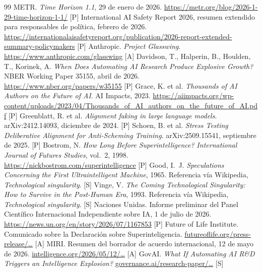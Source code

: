 \documentclass[10pt]{article}
\newcommand{\tP}{\textsf{\small[P]}}
\newcommand{\tS}{\textsf{\small[S]}}
\newcommand{\tA}{\textsf{\small[A]}}
\begin{document}
\begin{thebibliography}{99}\small
{} METR. \emph{Time Horizon 1.1}, 29 de enero de 2026. \url{https://metr.org/blog/2026-1-29-time-horizon-1-1/} \tP
{} International AI Safety Report 2026, resumen extendido para responsables de pol\'itica, febrero de 2026. \url{https://internationalaisafetyreport.org/publication/2026-report-extended-summary-policymakers} \tP
{} Anthropic. \emph{Project Glasswing}. \url{https://www.anthropic.com/glasswing} \tA
{} Davidson, T., Halperin, B., Houlden, T., Korinek, A. \emph{When Does Automating AI Research Produce Explosive Growth?} NBER Working Paper 35155, abril de 2026. \url{https://www.nber.org/papers/w35155} \tP
{} Grace, K. et al. \emph{Thousands of AI Authors on the Future of AI}. AI Impacts, 2023. \url{https://aiimpacts.org/wp-content/uploads/2023/04/Thousands_of_AI_authors_on_the_future_of_AI.pdf} \tP
{} Greenblatt, R. et al. \emph{Alignment faking in large language models}. arXiv:2412.14093, diciembre de 2024. \tP
{} Schoen, B. et al. \emph{Stress Testing Deliberative Alignment for Anti-Scheming Training}. arXiv:2509.15541, septiembre de 2025. \tP
{} Bostrom, N. \emph{How Long Before Superintelligence?} \emph{International Journal of Futures Studies}, vol.~2, 1998. \url{https://nickbostrom.com/superintelligence} \tP
{} Good, I.~J. \emph{Speculations Concerning the First Ultraintelligent Machine}, 1965. Referencia v\'ia Wikipedia, \emph{Technological singularity}. \tS
{} Vinge, V. \emph{The Coming Technological Singularity: How to Survive in the Post-Human Era}, 1993. Referencia v\'ia Wikipedia, \emph{Technological singularity}. \tS
{} Naciones Unidas. Informe preliminar del Panel Cient\'ifico Internacional Independiente sobre IA, 1 de julio de 2026. \url{https://news.un.org/en/story/2026/07/1167853} \tP
{} Future of Life Institute. Comunicado sobre la Declaraci\'on sobre Superinteligencia. \href{https://futureoflife.org/press-release/prominent-scientists-faith-leaders-policymakers-and-artists-call-for-a-prohibition-on-superintelligence/}{futureoflife.org/press-release/\ldots} \tA
{} MIRI. Resumen del borrador de acuerdo internacional, 12 de mayo de 2026. \href{https://intelligence.org/2026/05/12/summary-an-international-agreement-to-prevent-the-premature-creation-of-artificial-superintelligence/}{intelligence.org/2026/05/12/\ldots} \tA
{} GovAI. \emph{What If Automating AI R\&D Triggers an Intelligence Explosion?} \href{https://www.governance.ai/research-paper/what-if-automating-ai-r-d-triggers-an-intelligence-explosion}{governance.ai/research-paper/\ldots} \tS

\end{thebibliography}
\end{document}
